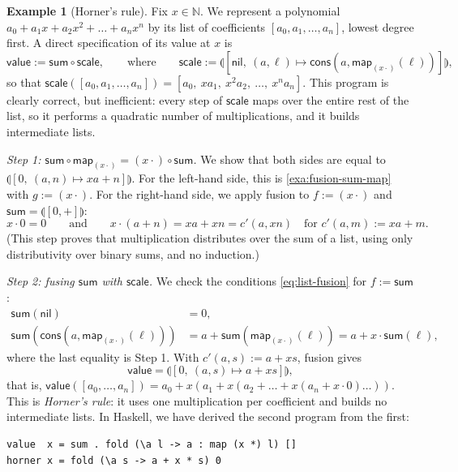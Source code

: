 \documentclass[a4paper,11pt, oneside,titlepage=false]{scrbook}
\theoremstyle{plain}
\theoremstyle{definition}
\newtheorem{exa}[thm]{Example}
\newcommand{\catam}[1]{\llparenthesis #1 \rrparenthesis}
\newcommand{\nil}{\ensuremath{\mathsf{nil}}}
\newcommand{\cons}{\ensuremath{\mathsf{cons}}}
\newcommand{\NN}{\ensuremath{\mathbb{N}}}
\begin{document}
\begin{exa}[Horner's rule]\label{exa:fusion-horner}
  Fix $x \in \NN$.
  We represent a polynomial $a_0 + a_1 x + a_2 x^2 + \dots + a_n x^n$ by its list of coefficients $[a_0, a_1, \dots, a_n]$, lowest degree first.
  A direct specification of its value at $x$ is
  \[
    \mathsf{value} := \mathsf{sum} \circ \mathsf{scale},
    \qquad\text{where}\qquad
    \mathsf{scale} := \catam{[\nil,\ (a, \ell) \mapsto \cons(a, \mathsf{map}_{(x\cdot)}(\ell))]},
  \]
  so that $\mathsf{scale}([a_0, a_1, \dots, a_n]) = [a_0,\ x a_1,\ x^2 a_2,\ \dots,\ x^n a_n]$.
  This program is clearly correct, but inefficient:
  every step of $\mathsf{scale}$ maps over the entire rest of the list, so it performs a quadratic number of multiplications, and it builds intermediate lists.

  \emph{Step 1: $\mathsf{sum} \circ \mathsf{map}_{(x\cdot)} = (x\cdot) \circ \mathsf{sum}$.}
  We show that both sides are equal to $\catam{[0,\ (a, n) \mapsto x a + n]}$.
  For the left-hand side, this is \cref{exa:fusion-sum-map} with $g := (x\cdot)$.
  For the right-hand side, we apply fusion to $f := (x\cdot)$ and $\mathsf{sum} = \catam{[0,+]}$:
  \[ x \cdot 0 = 0 \qquad\text{and}\qquad x \cdot (a + n) = x a + x n = c'(a, x n) \quad\text{for } c'(a, m) := x a + m. \]
  (This step proves that multiplication distributes over the sum of a list, using only distributivity over binary sums, and no induction.)

  \emph{Step 2: fusing $\mathsf{sum}$ with $\mathsf{scale}$.}
  We check the conditions \eqref{eq:list-fusion} for $f := \mathsf{sum}$:
  \begin{align*}
    \mathsf{sum}(\nil) &= 0, \\
    \mathsf{sum}(\cons(a, \mathsf{map}_{(x\cdot)}(\ell))) &= a + \mathsf{sum}(\mathsf{map}_{(x\cdot)}(\ell)) = a + x \cdot \mathsf{sum}(\ell),
  \end{align*}
  where the last equality is Step 1.
  With $c'(a, s) := a + x s$, fusion gives
  \[ \mathsf{value} = \catam{[0,\ (a, s) \mapsto a + x s]}, \]
  that is, $\mathsf{value}([a_0, \dots, a_n]) = a_0 + x(a_1 + x(a_2 + \dots + x(a_n + x \cdot 0)\dots))$.
  This is \emph{Horner's rule}: it uses one multiplication per coefficient and builds no intermediate lists.
  In Haskell, we have derived the second program from the first:
\begin{lstlisting}
value  x = sum . fold (\a l -> a : map (x *) l) []
horner x = fold (\a s -> a + x * s) 0
\end{lstlisting}
\end{exa}
\end{document}
